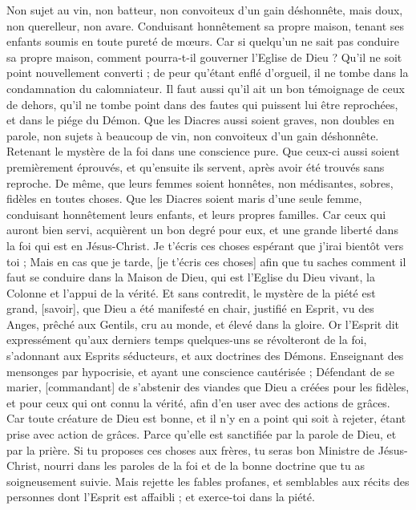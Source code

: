 \begin{multicols}{2}
Non sujet au vin, non batteur, non convoiteux d'un gain déshonnête, mais doux, non querelleur, non avare.
Conduisant honnêtement sa propre maison, tenant ses enfants soumis en toute pureté de mœurs.
Car si quelqu'un ne sait pas conduire sa propre maison, comment pourra-t-il gouverner l'Eglise de Dieu ?
Qu'il ne soit point nouvellement converti ; de peur qu'étant enflé d'orgueil, il ne tombe dans la condamnation du calomniateur.
Il faut aussi qu'il ait un bon témoignage de ceux de dehors, qu'il ne tombe point dans des fautes qui puissent lui être reprochées, et dans le piége du Démon.
Que les Diacres aussi soient graves, non doubles en parole, non sujets à beaucoup de vin, non convoiteux d'un gain déshonnête.
Retenant le mystère de la foi dans une conscience pure.
Que ceux-ci aussi soient premièrement éprouvés, et qu'ensuite ils servent, après avoir été trouvés sans reproche.
De même, que leurs femmes soient honnêtes, non médisantes, sobres, fidèles en toutes choses.
Que les Diacres soient maris d'une seule femme, conduisant honnêtement leurs enfants, et leurs propres familles.
Car ceux qui auront bien servi, acquièrent un bon degré pour eux, et une grande liberté dans la foi qui est en Jésus-Christ.
Je t'écris ces choses espérant que j'irai bientôt vers toi ;
Mais en cas que je tarde, [je t'écris ces choses] afin que tu saches comment il faut se conduire dans la Maison de Dieu, qui est l'Eglise du Dieu vivant, la Colonne et l'appui de la vérité.
Et sans contredit, le mystère de la piété est grand, [savoir], que Dieu a été manifesté en chair, justifié en Esprit, vu des Anges, prêché aux Gentils, cru au monde, et élevé dans la gloire.
\VerseOne{}Or l'Esprit dit expressément qu'aux derniers temps quelques-uns se révolteront de la foi, s'adonnant aux Esprits séducteurs, et aux doctrines des Démons.
Enseignant des mensonges par hypocrisie, et ayant une conscience cautérisée ;
Défendant de se marier, [commandant] de s'abstenir des viandes que Dieu a créées pour les fidèles, et pour ceux qui ont connu la vérité, afin d'en user avec des actions de grâces.
Car toute créature de Dieu est bonne, et il n'y en a point qui soit à rejeter, étant prise avec action de grâces.
Parce qu'elle est sanctifiée par la parole de Dieu, et par la prière.
Si tu proposes ces choses aux frères, tu seras bon Ministre de Jésus-Christ, nourri dans les paroles de la foi et de la bonne doctrine que tu as soigneusement suivie.
Mais rejette les fables profanes, et semblables aux récits des personnes dont l'Esprit est affaibli ; et exerce-toi dans la piété.

\end{multicols}
